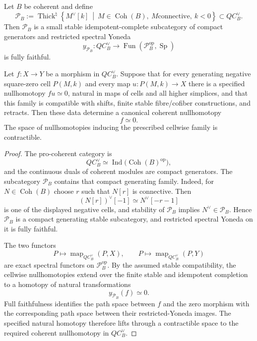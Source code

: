 \begin{lemma}
\label{lem:symmetry-noether-pro-coherent-generator-detection-of-coherent-nullhomotopies}
Let $B$ be coherent and define
\[
\boxed{
\mathcal P_B
:=
\operatorname{Thick}^{\natural}
\left\{
M^\vee[k]
\ \middle|\
M\in\operatorname{Coh}(B),\ M\text{connective},\ k<0
\right\}
\subset QC_B^\vee.
}
\]
Then $\mathcal P_B$ is a small stable idempotent-complete subcategory of compact
generators and restricted spectral Yoneda
\[
y_{\mathcal P_B}:
QC_B^\vee
\longrightarrow
\operatorname{Fun}(\mathcal P_B^{\mathrm{op}},\operatorname{Sp})
\]
is fully faithful.

Let $f:X\to Y$ be a morphism in $QC_B^\vee$.  Suppose that for every generating
negative square-zero cell $P(M,k)$ and every map $u:P(M,k)\to X$ there is a
specified nullhomotopy $fu\simeq0$, natural in maps of cells and all higher
simplices, and that this family is compatible with shifts, finite stable
fibre/cofiber constructions, and retracts.  Then these data determine a canonical
coherent nullhomotopy
\[
\boxed{f\simeq0.}
\]
The space of nullhomotopies inducing the prescribed cellwise family is
contractible.
\end{lemma}

\begin{proof}
The pro-coherent category is
\[
QC_B^\vee\simeq
\operatorname{Ind}\bigl(\operatorname{Coh}(B)^{\mathrm{op}}\bigr),
\]
and the continuous duals of coherent modules are compact generators.  The
subcategory $\mathcal P_B$ contains that compact generating family.  Indeed, for
$N\in\operatorname{Coh}(B)$ choose $r$ such that $N[r]$ is connective.  Then
\[
(N[r])^\vee[-1]
\simeq
N^\vee[-r-1]
\]
is one of the displayed negative cells, and stability of $\mathcal P_B$ implies
$N^\vee\in\mathcal P_B$.  Hence $\mathcal P_B$ is a compact generating stable
subcategory, and restricted spectral Yoneda on it is fully faithful.

The two functors
\[
P\longmapsto\operatorname{map}_{QC_B^\vee}(P,X),
\qquad
P\longmapsto\operatorname{map}_{QC_B^\vee}(P,Y)
\]
are exact spectral functors on $\mathcal P_B^{\mathrm{op}}$.  By the assumed
stable compatibility, the cellwise nullhomotopies extend over the finite stable
and idempotent completion to a homotopy of natural transformations
\[
y_{\mathcal P_B}(f)\simeq0.
\]
Full faithfulness identifies the path space between $f$ and the zero morphism
with the corresponding path space between their restricted-Yoneda images.  The
specified natural homotopy therefore lifts through a contractible space to the
required coherent nullhomotopy in $QC_B^\vee$.
\end{proof}

